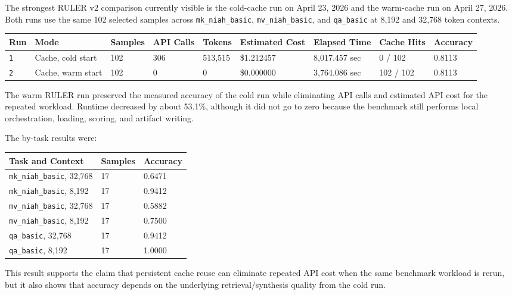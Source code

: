 \documentclass[10pt,a4paper]{article}
\begin{document}
The strongest RULER v2 comparison currently visible is the cold-cache run on April 23, 2026 and the warm-cache run on April 27, 2026. Both runs use the same 102 selected samples across \texttt{mk\_niah\_basic}, \texttt{mv\_niah\_basic}, and \texttt{qa\_basic} at 8,192 and 32,768 token contexts.

\begin{longtable}{@{}p{}p{}p{}p{}p{}p{}p{}p{}p{}@{}}
\toprule
\textbf{Run} & \textbf{Mode} & \textbf{Samples} & \textbf{API Calls} & \textbf{Tokens} & \textbf{Estimated Cost} & \textbf{Elapsed Time} & \textbf{Cache Hits} & \textbf{Accuracy} \\
\midrule
\endhead
\texttt{1} & Cache, cold start & 102 & 306 & 513,515 & \$1.212457 & 8,017.457 sec & 0 / 102 & 0.8113 \\
\texttt{2} & Cache, warm start & 102 & 0 & 0 & \$0.000000 & 3,764.086 sec & 102 / 102 & 0.8113 \\
\bottomrule
\end{longtable}

The warm RULER run preserved the measured accuracy of the cold run while eliminating API calls and estimated API cost for the repeated workload. Runtime decreased by about 53.1\%, although it did not go to zero because the benchmark still performs local orchestration, loading, scoring, and artifact writing.

The by-task results were:

\begin{longtable}{@{}p{}p{}p{}@{}}
\toprule
\textbf{Task and Context} & \textbf{Samples} & \textbf{Accuracy} \\
\midrule
\endhead
\texttt{mk\_niah\_basic}, 32,768 & 17 & 0.6471 \\
\texttt{mk\_niah\_basic}, 8,192 & 17 & 0.9412 \\
\texttt{mv\_niah\_basic}, 32,768 & 17 & 0.5882 \\
\texttt{mv\_niah\_basic}, 8,192 & 17 & 0.7500 \\
\texttt{qa\_basic}, 32,768 & 17 & 0.9412 \\
\texttt{qa\_basic}, 8,192 & 17 & 1.0000 \\
\bottomrule
\end{longtable}

This result supports the claim that persistent cache reuse can eliminate repeated API cost when the same benchmark workload is rerun, but it also shows that accuracy depends on the underlying retrieval/synthesis quality from the cold run.
\end{document}
